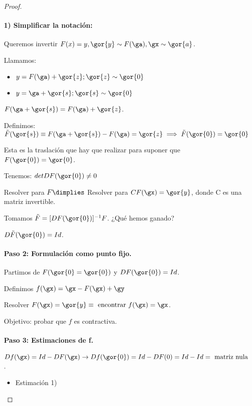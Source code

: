 \documentclass{apuntes}
\begin{document}
\begin{proof}
 \paragraph{1) Simplificar la notación:}
 
 Queremos invertir $F(x) = y, \gor{y} \sim F(\ga), \gx \sim \gor{a}$.
 
 Llamamos:
 \begin{itemize}
  \item $y = F(\ga) + \gor{z}; \gor{z} \sim \gor{0}$
  \item $y = \ga + \gor{s}; \gor{s} \sim \gor{0}$
 \end{itemize}
 $F(\ga+\gor{s}) = F(\ga)+\gor{z}$.
 
 Definimos: $\tilde{F}(\gor{s}) \equiv F(\ga + \gor{s}) - F(\ga) = \gor{z} \implies \tilde{F}(\gor{0}) = \gor{0}$
 
 Esta es la traslación que hay que realizar para suponer que $F(\gor{0}) = \gor{0}$.
 
 Tenemos: $detDF(\gor{0}) \neq 0$
 
 Resolver para $F \dimplies $ Resolver para $CF(\gx) = \gor{y}$, donde C es una matriz invertible.
 
 Tomamos $\tilde{F} = [DF(\gor{0})]^{-1}F$. ¿Qué hemos ganado?
 
 $D\tilde{F}(\gor{0}) = Id$.
 
 \paragraph{Paso 2: Formulación como punto fijo.}

 Partimos de $F(\gor{0}=\gor{0})$ y $ DF(\gor{0}) = Id$.
 
 Definimos $f(\gx) = \gx - F(\gx)+\gy$
 
 Resolver $F(\gx) = \gor{y} \equiv \text{ encontrar } f(\gx) = \gx$.
 
 Objetivo: probar que $f$ es contractiva.
 
 \paragraph{Paso 3: Estimaciones de f.\\}
 
 $Df(\gx) = Id - DF(\gx) \rightarrow Df(\gor{0}) = Id - DF(0) = Id - Id = \text{ matriz nula}$.
 
 \begin{itemize}
  \item Estimación 1)
  

\end{itemize}
\end{proof}
\end{document}
